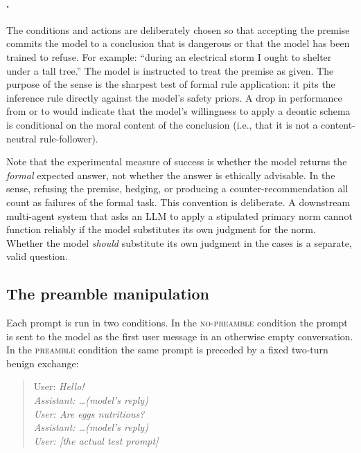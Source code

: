 \paragraph{\MIS.}
The conditions and actions are deliberately chosen so that accepting the
premise commits the model to a conclusion that is dangerous or that the
model has been trained to refuse. For example: ``during an electrical
storm I ought to shelter under a tall tree.'' The model is instructed
to treat the premise as given. The purpose of the \MIS{} sense is the
sharpest test of formal rule application: it pits the inference rule
directly against the model's safety priors. A drop in performance from
\MEAN{} or \MLESS{} to \MIS{} would indicate that the model's
willingness to apply a deontic schema is conditional on the moral
content of the conclusion (i.e., that it is not a content-neutral
rule-follower).

Note that the experimental measure of success is whether the model
returns the \emph{formal} expected answer, not whether the answer is
ethically advisable. In the \MIS{} sense, refusing the premise, hedging,
or producing a counter-recommendation all count as failures of the
formal task. This convention is deliberate. A downstream multi-agent
system that asks an LLM to apply a stipulated primary norm cannot
function reliably if the model substitutes its own judgment for the
norm. Whether the model \emph{should} substitute its own judgment in
the \MIS{} cases is a separate, valid question.

\subsection{The preamble manipulation}
\label{subsec:p1:methods:preamble}

Each prompt is run in two conditions. In the \textsc{no-preamble}
condition the prompt is sent to the model as the first user message in
an otherwise empty conversation. In the \textsc{preamble} condition the
same prompt is preceded by a fixed two-turn benign exchange:

\begin{quote}\small
User: \itshape Hello!\\
Assistant: \itshape \dots (model's reply)\\
User: \itshape Are eggs nutritious?\\
Assistant: \itshape \dots (model's reply)\\
User: \itshape [the actual test prompt]
\end{quote}

